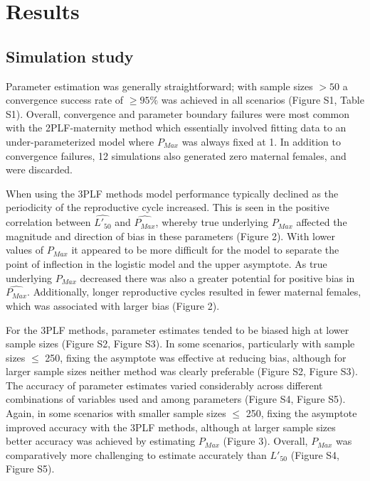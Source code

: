 \documentclass[
]{article}
\begin{document}
\section{Results}\label{results}

\subsection{Simulation study}\label{simulation-study}

Parameter estimation was generally straightforward; with sample sizes \(> 50\) a convergence success rate of \(\geq 95\%\) was achieved in all scenarios (Figure S1, Table S1). Overall, convergence and parameter boundary failures were most common with the 2PLF-maternity method which essentially involved fitting data to an under-parameterized model where \(P_{Max}\) was always fixed at 1. In addition to convergence failures, 12 simulations also generated zero maternal females, and were discarded.

When using the 3PLF methods model performance typically declined as the periodicity of the reproductive cycle increased. This is seen in the positive correlation between \(\hat{L'_{50}}\) and \(\hat{P_{Max}}\), whereby true underlying \(P_{Max}\) affected the magnitude and direction of bias in these parameters (Figure 2). With lower values of \(P_{Max}\) it appeared to be more difficult for the model to separate the point of inflection in the logistic model and the upper asymptote. As true underlying \(P_{Max}\) decreased there was also a greater potential for positive bias in \(\hat{P_{Max}}\). Additionally, longer reproductive cycles resulted in fewer maternal females, which was associated with larger bias (Figure 2).

For the 3PLF methods, parameter estimates tended to be biased high at lower sample sizes (Figure S2, Figure S3). In some scenarios, particularly with sample sizes \(\leq\) 250, fixing the asymptote was effective at reducing bias, although for larger sample sizes neither method was clearly preferable (Figure S2, Figure S3). The accuracy of parameter estimates varied considerably across different combinations of variables used and among parameters (Figure S4, Figure S5). Again, in some scenarios with smaller sample sizes \(\leq\) 250, fixing the asymptote improved accuracy with the 3PLF methods, although at larger sample sizes better accuracy was achieved by estimating \(P_{Max}\) (Figure 3). Overall, \(P_{Max}\) was comparatively more challenging to estimate accurately than \(L'_{50}\) (Figure S4, Figure S5).
\end{document}
